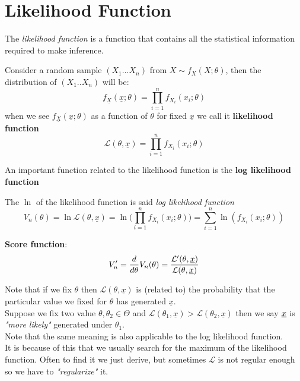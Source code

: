 \chapter{Likelihood Function}
\label{cha:likf}
\vspace{15pt}



The \textit{likelihood function} is a function that contains all the statistical information required to make inference.\\
\begin{defi}
	Consider a random sample  $(X_1...X_n)$ from $ X \sim f_X(X; \theta)$, then the distribution of $(X_1..X_n)$ will be:
	$$f_{\underline X}(\underline x;\theta)=\prod_{i=1}^{n}f_{X_i}(x_i;\theta)$$
	when we see $f_{\underline X}(\underline x;\theta)$ as a function of $\theta$ for fixed $\underline x$ we call it \textbf{likelihood function}
	$$\mathcal{L}(\theta,\underline x)=\prod_{i=1}^{n}f_{X_i}(x_i;\theta)$$
\end{defi}
	An important function related to the likelihood function is the \textbf{log likelihood function} 
\begin{defi}
	The $\ln$ of the likelihood function is said \textit{log likelihood function}
	$$V_n(\theta)=\ln\mathcal{L}(\theta,\underline x)=\ln \bigg( \prod_{i=1}^{n}f_{X_i}(x_i;\theta) \bigg)=\sum_{i=1}^{n}\ln( f_{X_i}(x_i;\theta))$$
\end{defi}
\begin{defi}\label{defi:scoref}
	\textbf{Score function}:
	$$V'_n=\frac{d}{d \theta}V_n(\theta)=\frac{\mathcal{L}'(\theta, \underline x)}{\mathcal{L}(\theta, \underline x)}$$
\end{defi}
Note that if we fix $\theta$ then $\mathcal{L}(\theta,\underline x)$ is (related to) the probability that the particular value we fixed for $\theta$ has generated $\underline x$.\\
Suppose we fix two value $\theta,\theta_2\in \Theta$ and 
$\mathcal{L}(\theta_1,\underline x)>\mathcal{L}(\theta_2,\underline x)$ then
we say $\underline x$ is \textit{"more likely"} generated under $\theta_1$.\\
Note that the same meaning is also applicable to the log likelihood function.\\
It is because of this that we usually search for the maximum of the likelihood function. Often to find it we just derive, but sometimes $\mathcal{L}$ is not regular enough so we have to \textit{"regularize"} it.
